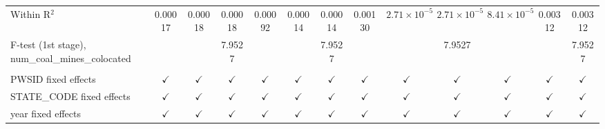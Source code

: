 \begin{table}[htbp]
\begin{adjustbox}{width = \textwidth, center}
\begin{tabular}{lcccccccccccc}
         Within R$^2$                                       & 0.00017       & 0.00018       & 0.00018       & 0.00092       & 0.00014       & 0.00014       & 0.00130       & $2.71\times 10^{-5}$  & $2.71\times 10^{-5}$  & $8.41\times 10^{-5}$  & 0.00312        & 0.00312\\  
         F-test (1st stage), num\_coal\_mines\_colocated    &               &               & 7.9527        &               &               & 7.9527        &               &                       & 7.9527                &                       &                & 7.9527\\  
          \\
         PWSID fixed effects                                & $\checkmark$  & $\checkmark$  & $\checkmark$  & $\checkmark$  & $\checkmark$  & $\checkmark$  & $\checkmark$  & $\checkmark$          & $\checkmark$          & $\checkmark$          & $\checkmark$   & $\checkmark$\\   
         STATE\_CODE fixed effects                          & $\checkmark$  & $\checkmark$  & $\checkmark$  & $\checkmark$  & $\checkmark$  & $\checkmark$  & $\checkmark$  & $\checkmark$          & $\checkmark$          & $\checkmark$          & $\checkmark$   & $\checkmark$\\   
         year fixed effects                                 & $\checkmark$  & $\checkmark$  & $\checkmark$  & $\checkmark$  & $\checkmark$  & $\checkmark$  & $\checkmark$  & $\checkmark$          & $\checkmark$          & $\checkmark$          & $\checkmark$   & $\checkmark$\\   
         \bottomrule
      \end{tabular}
   \end{adjustbox}
\end{table}


